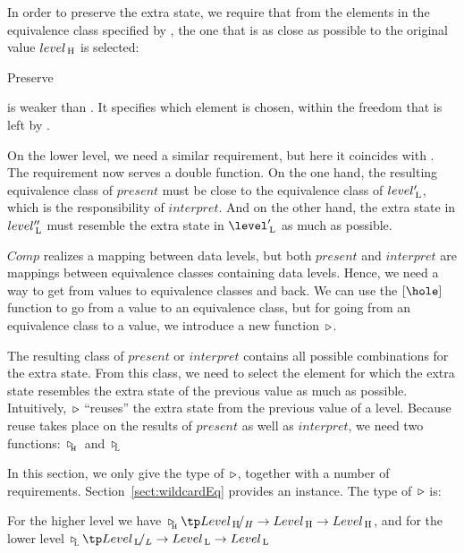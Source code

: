 In order to preserve the extra state, we require that from the elements in the equivalence class specified by , the one that is as close as possible to the original value $level_{\, \mathrm H}$ is selected:

	{Preserve}

 is weaker than . It specifies which element is chosen, within the freedom that is left by .

On the lower level, we need a similar requirement, but here it coincides with . The  requirement now serves a double function. On the one hand, the resulting equivalence class of $present$ must be close to the equivalence class of $level'_{\, \mathrm L}$, which is the responsibility of $interpret$. And on the other hand, the extra state in $level''_{\, \mathrm L}$ must resemble the extra state in $\level'\L$ as much as possible.


$Comp$ realizes a mapping between data levels, but both $present$ and $interpret$ are mappings between equivalence classes containing data levels. Hence, we need a way to get from values to equivalence classes and back. We can use the $\eqhole$ function to go from a value to an equivalence class, but for going from an equivalence class to a value, we introduce a new function~$\triangleright$.

The resulting class of $present$ or $interpret$ contains all possible combinations for the extra state.
From this class, we need to select the element for which the extra state resembles the extra state of the previous value as much as possible. Intuitively,~$\triangleright$ ``reuses'' the extra state from the previous value of a level. Because reuse takes place on the results of $present$ as well as $interpret$, we need two functions: $\,\triangleright_{_{\!\!\mathrm{H}}}\,$ and $\,\triangleright_{_{\!\!\mathrm{L}}}\,$

In this section, we only give the type of~$\triangleright$, together with a number of requirements. Section~\ref{sect:wildcardEq} provides an instance. The type of~$\triangleright$ is:


For the higher level we have $\reuze{\mathrm{H}} \tp  \Eqclass{Level\H}{H} \to Level\H \to Level\H$, and for the lower level $\reuze{\mathrm{L}} \tp  \Eqclass{Level\L}{L} \to Level\L \to Level\L$

